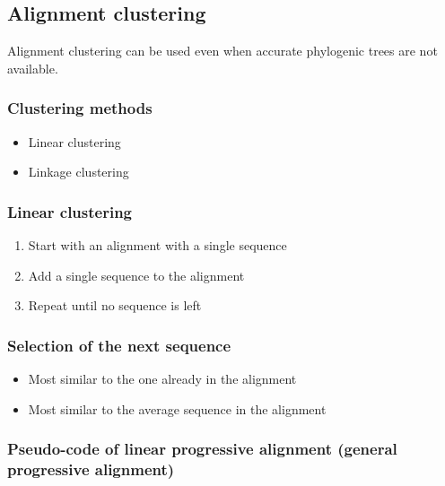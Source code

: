 %
%

%
%
\subsection{Alignment clustering}
Alignment clustering can be used even when accurate phylogenic trees are not available. 

%
%
\subsubsection*{Clustering methods}
\begin{itemize}
\item Linear clustering
\item Linkage clustering
\end{itemize}

%
%
\subsubsection*{Linear clustering}
\begin{enumerate}
\item Start with an alignment with a single sequence
\item Add a single sequence to the alignment
\item Repeat until no sequence is left
\end{enumerate}

%
%
\subsubsection*{Selection of the next sequence}
\begin{itemize}
\item Most similar to the one already in the alignment
\item Most similar to the average sequence in the alignment
\end{itemize}

%
%
\subsubsection*{Pseudo-code of linear progressive alignment (general progressive alignment)}

